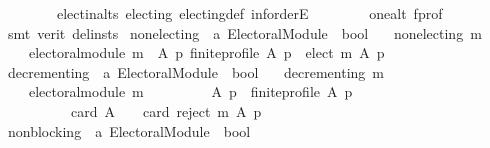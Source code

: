\begin{isabellebody}
\ \ \ \ \ \ \ \ elect{\isacharunderscore}{\kern0pt}in{\isacharunderscore}{\kern0pt}alts\ electing\ electing{\isacharunderscore}{\kern0pt}def\ inf{\isachardot}{\kern0pt}orderE\isanewline
\ \ \ \ \ \ \ \ one{\isacharunderscore}{\kern0pt}alt\ f{\isacharunderscore}{\kern0pt}prof\isanewline
\ \ \isamarkupfalse%
\ {\isacharparenleft}{\kern0pt}smt\ {\isacharparenleft}{\kern0pt}verit{\isacharcomma}{\kern0pt}\ del{\isacharunderscore}{\kern0pt}insts{\isacharparenright}{\kern0pt}{\isacharparenright}{\kern0pt}%
\endisatagproof
{\isafoldproof}%
%
\isadelimproof
\isanewline
%
\endisadelimproof
\isanewline
\isanewline
\isanewline
{}\isamarkupfalse%
\ non{\isacharunderscore}{\kern0pt}electing\ {\isacharcolon}{\kern0pt}{\isacharcolon}{\kern0pt}\ {\isachardoublequoteopen}{\isacharprime}{\kern0pt}a\ Electoral{\isacharunderscore}{\kern0pt}Module\ {\isasymRightarrow}\ bool{\isachardoublequoteclose}\ \isanewline
\ \ {\isachardoublequoteopen}non{\isacharunderscore}{\kern0pt}electing\ m\ {\isasymequiv}\isanewline
\ \ \ \ electoral{\isacharunderscore}{\kern0pt}module\ m\ {\isasymand}\ {\isacharparenleft}{\kern0pt}{\isasymforall}A\ p{\isachardot}{\kern0pt}\ finite{\isacharunderscore}{\kern0pt}profile\ A\ p\ {\isasymlongrightarrow}\ elect\ m\ A\ p\ {\isacharequal}{\kern0pt}\ {\isacharbraceleft}{\kern0pt}{\isacharbraceright}{\kern0pt}{\isacharparenright}{\kern0pt}{\isachardoublequoteclose}\isanewline
\isanewline
\isanewline
{}\isamarkupfalse%
\ decrementing\ {\isacharcolon}{\kern0pt}{\isacharcolon}{\kern0pt}\ {\isachardoublequoteopen}{\isacharprime}{\kern0pt}a\ Electoral{\isacharunderscore}{\kern0pt}Module\ {\isasymRightarrow}\ bool{\isachardoublequoteclose}\ \isanewline
\ \ {\isachardoublequoteopen}decrementing\ m\ {\isasymequiv}\isanewline
\ \ \ \ electoral{\isacharunderscore}{\kern0pt}module\ m\ {\isasymand}\ {\isacharparenleft}{\kern0pt}\isanewline
\ \ \ \ \ \ {\isasymforall}\ A\ p\ {\isachardot}{\kern0pt}\ finite{\isacharunderscore}{\kern0pt}profile\ A\ p\ {\isasymlongrightarrow}\isanewline
\ \ \ \ \ \ \ \ \ \ {\isacharparenleft}{\kern0pt}card\ A\ {\isachargreater}{\kern0pt}\ {}\ {\isasymlongrightarrow}\ card\ {\isacharparenleft}{\kern0pt}reject\ m\ A\ p{\isacharparenright}{\kern0pt}\ {\isasymge}\ {}{\isacharparenright}{\kern0pt}{\isacharparenright}{\kern0pt}{\isachardoublequoteclose}\isanewline
\isanewline
\isanewline
{}\isamarkupfalse%
\ non{\isacharunderscore}{\kern0pt}blocking\ {\isacharcolon}{\kern0pt}{\isacharcolon}{\kern0pt}\ {\isachardoublequoteopen}{\isacharprime}{\kern0pt}a\ Electoral{\isacharunderscore}{\kern0pt}Module\ {\isasymRightarrow}\ bool{\isachardoublequoteclose}\ \isanewline

\end{isabellebody}
